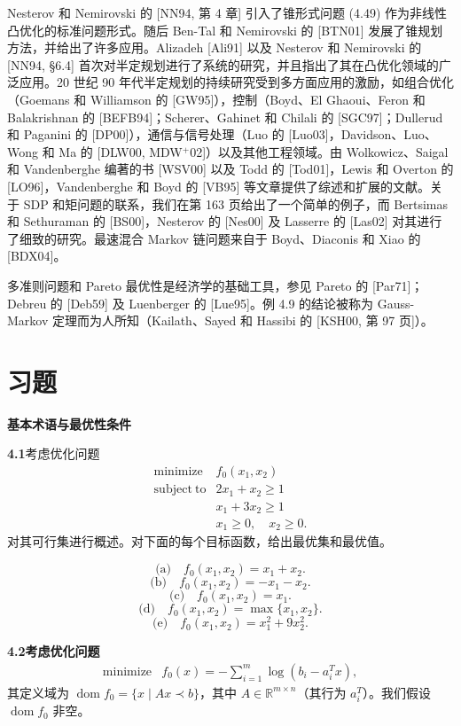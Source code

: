 \documentclass[UTF8, 12pt, fontset=fandol, oneside]{ctexart}
\begin{document}
Nesterov 和 Nemirovski 的 [NN94, 第 4 章] 引入了锥形式问题 (4.49) 作为非线性凸优化的标准问题形式。随后 Ben-Tal 和 Nemirovski 的 [BTN01] 发展了锥规划方法，并给出了许多应用。Alizadeh [Ali91] 以及 Nesterov 和 Nemirovski 的 [NN94, \S 6.4] 首次对半定规划进行了系统的研究，并且指出了其在凸优化领域的广泛应用。20 世纪 90 年代半定规划的持续研究受到多方面应用的激励，如组合优化（Goemans 和 Williamson 的 [GW95]），控制（Boyd、El Ghaoui、Feron 和 Balakrishnan 的 [BEFB94]；Scherer、Gahinet 和 Chilali 的 [SGC97]；Dullerud 和 Paganini 的 [DP00]），通信与信号处理（Luo 的 [Luo03]，Davidson、Luo、Wong 和 Ma 的 [DLW00, MDW$^+$02]）以及其他工程领域。由 Wolkowicz、Saigal 和 Vandenberghe 编著的书 [WSV00] 以及 Todd 的 [Tod01]，Lewis 和 Overton 的 [LO96]，Vandenberghe 和 Boyd 的 [VB95] 等文章提供了综述和扩展的文献。关于 SDP 和矩问题的联系，我们在第 163 页给出了一个简单的例子，而 Bertsimas 和 Sethuraman 的 [BS00]，Nesterov 的 [Nes00] 及 Lasserre 的 [Las02] 对其进行了细致的研究。最速混合 Markov 链问题来自于 Boyd、Diaconis 和 Xiao 的 [BDX04]。

多准则问题和 Pareto 最优性是经济学的基础工具，参见 Pareto 的 [Par71]；Debreu 的 [Deb59] 及 Luenberger 的 [Lue95]。例 4.9 的结论被称为 Gauss-Markov 定理而为人所知（Kailath、Sayed 和 Hassibi 的 [KSH00, 第 97 页]）。

\section*{习题}

\noindent\textbf{基本术语与最优性条件}

\noindent\textbf{4.1}\quad 考虑优化问题
\[
\begin{array}{ll}
\mathop{\mathrm{minimize}} & f_0(x_1,x_2)\\
\mathrm{subject\ to} & 2x_1+x_2\geq 1\\
& x_1+3x_2\geq 1\\
& x_1\geq 0,\quad x_2\geq 0.
\end{array}
\]
对其可行集进行概述。对下面的每个目标函数，给出最优集和最优值。

\[
\text{(a)}\quad f_0(x_1,x_2)=x_1+x_2.
\]
\[
\text{(b)}\quad f_0(x_1,x_2)=-x_1-x_2.
\]
\[
\text{(c)}\quad f_0(x_1,x_2)=x_1.
\]
\[
\text{(d)}\quad f_0(x_1,x_2)=\max\{x_1,x_2\}.
\]
\[
\text{(e)}\quad f_0(x_1,x_2)=x_1^2+9x_2^2.
\]

\noindent\textbf{4.2\quad 考虑优化问题}
\[
\begin{array}{ll}
\mathop{\mathrm{minimize}} & f_0(x)=-\sum_{i=1}^m\log(b_i-a_i^Tx),
\end{array}
\]
其定义域为 $\operatorname{dom} f_0=\{x\mid Ax\prec b\}$，其中 $A\in\mathbb{R}^{m\times n}$（其行为 $a_i^T$）。我们假设 $\operatorname{dom} f_0$ 非空。
\end{document}

